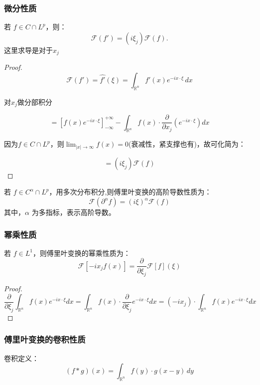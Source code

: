 \documentclass[12pt,a4paper]{article}
\numberwithin{subsection}{section}   %
\numberwithin{subsubsection}{subsection}
\theoremstyle{plain}
\theoremstyle{definition}
\theoremstyle{remark}
\theoremstyle{remark}
\begin{document}
	\subsubsection{微分性质}
	若 \( f \in C \cap L^p \)，则：
	\begin{equation}
		\mathcal{F}(f') = (i \xi_j) \mathcal{F}(f).
	\end{equation}
	这里求导是对于$x_j$
	
	\begin{proof}
		\[
			\mathcal{F}(f') = \hat{f'}(\xi) = \int_{\mathbb{R}^n} f'(x) e^{-i x \cdot \xi} \, dx
		\]
		
		对$x_j$做分部积分
		
	\[
			= \left[ f(x) e^{-i x \cdot \xi} \right]_{-\infty}^{+\infty} - \int_{\mathbb{R}^n} f(x) \cdot \frac{\partial}{\partial x_j} \left( e^{-i x \cdot \xi} \right) dx
		\]	
		
		因为\( f \in C \cap L^p \)，则$\lim_{|x| \to \infty} f(x) = 0$(衰减性，紧支撑也有)，故可化简为：
		
	\[	
			= (i \xi_j) \mathcal{F}(f)
	\]	
	\end{proof}
	
	若 \( f \in C^\alpha \cap L^p \)，用多次分布积分,则傅里叶变换的高阶导数性质为：
	\begin{equation}\label{weifen}
		\mathcal{F}(\partial^\alpha f) = (i \xi)^\alpha \mathcal{F}(f)
	\end{equation}
	其中，\(\alpha\) 为多指标，表示高阶导数。
	
	
		\subsubsection{幂乘性质}
	若 \( f \in L^1 \)，则傅里叶变换的幂乘性质为：
	\begin{equation}
		\mathcal{F}[-i x_j f(x)] = \frac{\partial}{\partial \xi_j} \mathcal{F}[f](\xi)
	\end{equation}
	
	\begin{proof}
		\[	
		\frac{\partial}{\partial \xi_j} \int_{\mathbb{R}^n} f(x) e^{-i x \cdot \xi} dx = \int_{\mathbb{R}^n} f(x) \cdot \frac{\partial}{\partial \xi_j} e^{-i x \cdot \xi} dx= (-i x_j) \cdot \int_{\mathbb{R}^n} f(x) e^{-i x \cdot \xi} dx
	\]	
	
\end{proof}
	
	
	\subsubsection{傅里叶变换的卷积性质}
		卷积定义：
	\begin{equation}
		(f * g)(x) = \int_{\mathbb{R}^n} f(y) \cdot g(x - y) \, dy
	\end{equation}
	
\end{document}
